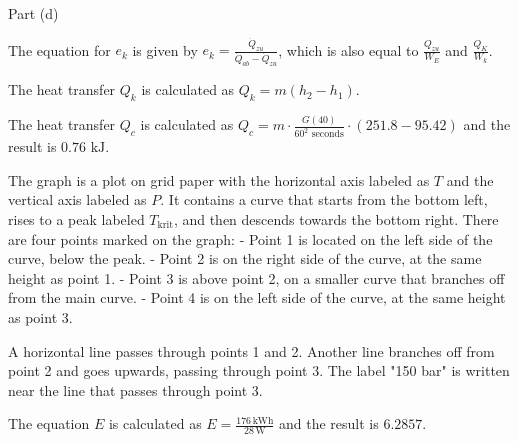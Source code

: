 Part (d)

The equation for \( e_k \) is given by \( e_k = \frac{\dot{Q}_{zu}}{\dot{Q}_{ab} - \dot{Q}_{zu}} \), which is also equal to \( \frac{Q_{zu}}{W_E} \) and \( \frac{Q_K}{W_k} \).

The heat transfer \( Q_k \) is calculated as \( Q_k = m(h_2 - h_1) \).

The heat transfer \( Q_c \) is calculated as \( Q_c = m \cdot \frac{G(40)}{60^2 \text{ seconds}} \cdot (251.8 - 95.42) \) and the result is \( 0.76 \text{ kJ} \).

The graph is a plot on grid paper with the horizontal axis labeled as \( T \) and the vertical axis labeled as \( P \). It contains a curve that starts from the bottom left, rises to a peak labeled \( T_{\text{krit}} \), and then descends towards the bottom right. There are four points marked on the graph:
- Point 1 is located on the left side of the curve, below the peak.
- Point 2 is on the right side of the curve, at the same height as point 1.
- Point 3 is above point 2, on a smaller curve that branches off from the main curve.
- Point 4 is on the left side of the curve, at the same height as point 3.

A horizontal line passes through points 1 and 2. Another line branches off from point 2 and goes upwards, passing through point 3. The label "150 bar" is written near the line that passes through point 3.

The equation \( E \) is calculated as \( E = \frac{176 \, \text{kWh}}{28 \, \text{W}} \) and the result is \( 6.2857 \).